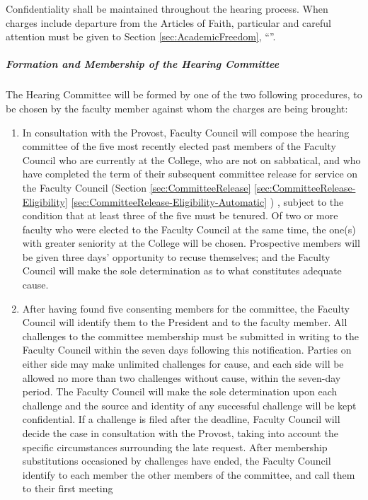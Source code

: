 				Confidentiality shall be maintained throughout the hearing process.  When charges include departure from the Articles of Faith, particular and careful attention must be given to Section
				\ref{sec:AcademicFreedom},
				``''.
				\subparagraph{Formation and Membership of the Hearing Committee}
					The Hearing Committee will be formed by one of the two following procedures, to be chosen by the faculty member against whom the charges are being brought:
					\label{sec:DischargeForCauseHearing-FormationOfTheHearingCommittee-Option1}
					\begin{enumerate}[label=\alph*)]
						\item{
							\label{sec:DischargeForCauseHearing-FormationOfTheHearingCommittee-Option1-First}
							In consultation with the Provost, Faculty Council will compose the hearing committee of the five most recently elected past members of the Faculty Council who are currently at the College, who are not on sabbatical, and who have completed the term of their subsequent committee release for service on the Faculty Council
							(Section
							\ref{sec:CommitteeRelease}
							\ref{sec:CommitteeRelease-Eligibility}
							\ref{sec:CommitteeRelease-Eligibility-Automatic}
							)
							, subject to the condition that at least three of the five must be tenured.  Of two or more faculty who were elected to the Faculty Council at the same time, the one(s) with greater seniority at the College will be chosen.  Prospective members will be given three days' opportunity to recuse themselves; and the Faculty Council will make the sole determination as to what constitutes adequate cause.}
						\item{After having found five consenting members for the committee, the Faculty Council will identify them to the President and to the faculty member.  All challenges to the committee membership must be submitted in writing to the Faculty Council within the seven days following this notification.  Parties on either side may make unlimited challenges for cause, and each side will be allowed no more than two challenges without cause, within the seven-day period.  The Faculty Council will make the sole determination upon each challenge and the source and identity of any successful challenge will be kept confidential.  If a challenge is filed after the deadline, Faculty Council will decide the case in consultation with the Provost, taking into account the specific circumstances surrounding the late request.  After membership substitutions occasioned by challenges have ended, the Faculty Council identify to each member the other members of the committee, and call them to their first meeting
}
\end{enumerate}
